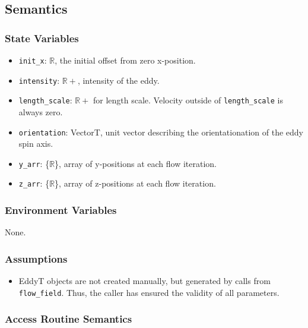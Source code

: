 \documentclass[12pt, titlepage]{article}
\begin{document}
\subsection{Semantics}

\subsubsection{State Variables}
\begin{itemize}
  \item \texttt{init\_x}: $\mathbb{R}$, the initial offset from zero x-position.
  \item \texttt{intensity}: $\mathbb{R+}$, intensity of the eddy.
  \item \texttt{length\_scale}: $\mathbb{R+}$ for length scale. Velocity outside of \texttt{length\_scale} is always zero.
  \item \texttt{orientation}: VectorT, unit vector describing the orientationation of the eddy spin axis.
  \item \texttt{y\_arr}: \{$\mathbb{R}$\}, array of y-positions at each flow iteration.
  \item \texttt{z\_arr}: \{$\mathbb{R}$\}, array of z-positions at each flow iteration.
\end{itemize}

\subsubsection{Environment Variables}
None.

\subsubsection{Assumptions}
\begin{itemize}
  \item EddyT objects are not created manually, but generated by calls from \texttt{flow\_field}. Thus, the caller has ensured the validity of all parameters.
\end{itemize}

\subsubsection{Access Routine Semantics}
\end{document}
